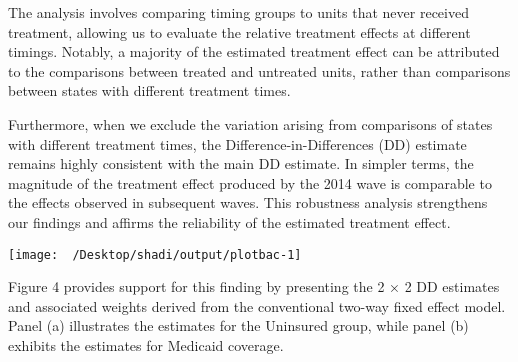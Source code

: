 \documentclass[
]{article}
\begin{document}
The analysis involves comparing timing groups to units that never
received treatment, allowing us to evaluate the relative treatment
effects at different timings. Notably, a majority of the estimated
treatment effect can be attributed to the comparisons between treated
and untreated units, rather than comparisons between states with
different treatment times.

Furthermore, when we exclude the variation arising from comparisons of
states with different treatment times, the Difference-in-Differences
(DD) estimate remains highly consistent with the main DD estimate. In
simpler terms, the magnitude of the treatment effect produced by the
2014 wave is comparable to the effects observed in subsequent waves.
This robustness analysis strengthens our findings and affirms the
reliability of the estimated treatment effect.

\begin{center}\texttt{[image: ~/Desktop/shadi/output/plotbac-1]} \end{center}

Figure 4 provides support for this finding by presenting the 2 × 2 DD
estimates and associated weights derived from the conventional two-way
fixed effect model. Panel (a) illustrates the estimates for the
Uninsured group, while panel (b) exhibits the estimates for Medicaid
coverage.
\end{document}
